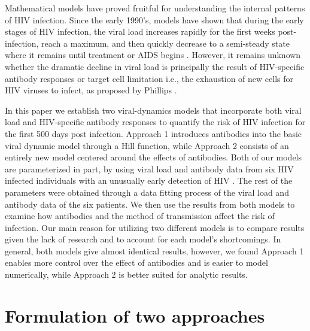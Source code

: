 \documentclass[]{elsarticle}
\theoremstyle{definition}
\begin{document}
Mathematical models have proved fruitful for understanding the internal patterns of HIV infection. Since the early 1990's, models have shown that during the early stages of HIV infection, the viral load increases rapidly for the first weeks post-infection, reach a maximum, and then quickly decrease to a semi-steady state where it remains until treatment or AIDS begins \cite{Stafford2000}. However, it remains unknown whether the dramatic decline in viral load is principally the result of HIV-specific antibody responses or target cell limitation i.e., the exhaustion of new cells for HIV viruses to infect, as proposed by Phillips \cite{phillips1996reduction}.

In this paper we establish two viral-dynamics models that incorporate both viral load and HIV-specific antibody responses to quantify the risk of HIV infection for the first 500 days post infection. Approach 1 introduces antibodies into the basic viral dynamic model through a Hill function, while Approach 2 consists of an entirely new model centered around the effects of antibodies. Both of our models are parameterized in part, by using viral load and antibody data from six HIV infected individuals with an unusually early detection of HIV \cite{Tomaras}. The rest of the parameters were obtained through a data fitting process of the viral load and antibody data of the six patients. We then use the results from both models to examine how antibodies and the method of transmission affect the risk of infection. Our main reason for utilizing two different models is to compare results given the lack of research and to account for each model's shortcomings. In general, both models give almost identical results, however, we found Approach 1 enables more control over the effect of antibodies and is easier to model numerically, while Approach 2 is better suited for analytic results.


\medskip

\section{Formulation of two approaches}
\end{document}
